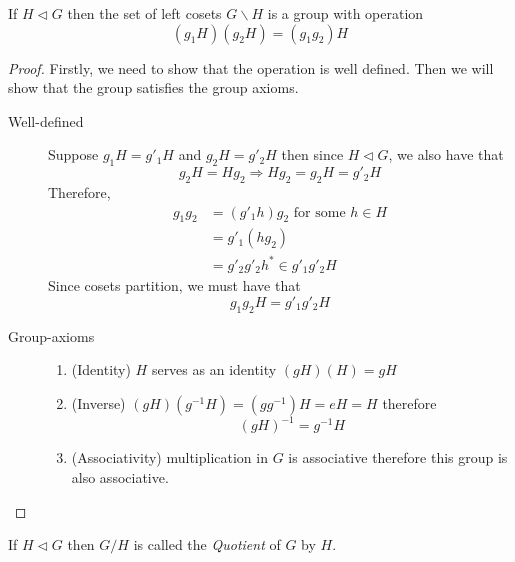 \documentclass{article}
\begin{document}
\begin{thm}
    If $H \triangleleft G$ then the set of left cosets $G \backslash H$ is a group with operation
    \[
        (g_1H)(g_2H) = (g_1g_2)H  
    \]
\end{thm}

\begin{proof} Firstly, we need to show that the operation is well defined. Then we will show that the group satisfies the group axioms.
    \begin{description}
        \item[Well-defined] Suppose $g_1H = g'_1H$ and $g_2H = g'_2H$ then since $H \triangleleft G$, we also have that
        \[
            g_2H = Hg_2 \Rightarrow Hg_2 = g_2H = g'_2H 
        \]
        Therefore,
        \begin{align*}
            g_1g_2 &= (g'_1h)g_2 \text{ for some } h \in H\\
            &= g'_1 (hg_2) \\
            &= g'_2 g'_2h^* \in g'_1g'_2H
        \end{align*}
        Since cosets partition, we must have that
        \[
            g_1g_2H = g'_1g'_2H  
        \]

        \item[Group-axioms]\leavevmode
        \begin{enumerate}
            \item (Identity) $H$ serves as an identity $(gH)(H) = gH$
            \item (Inverse) $(gH)(g^{-1}H) = (gg^{-1})H = eH = H$ therefore
            \[
                (gH)^{-1} = g^{-1}H    
            \]
            \item (Associativity) multiplication in $G$ is associative therefore this group is also associative.
        \end{enumerate}
    \end{description}
\end{proof}


\begin{defi}[Quotient]
    If $H \triangleleft G$ then $G / H $ is called the \emph{Quotient} of $G$ by $H$.
\end{defi}
\end{document}

